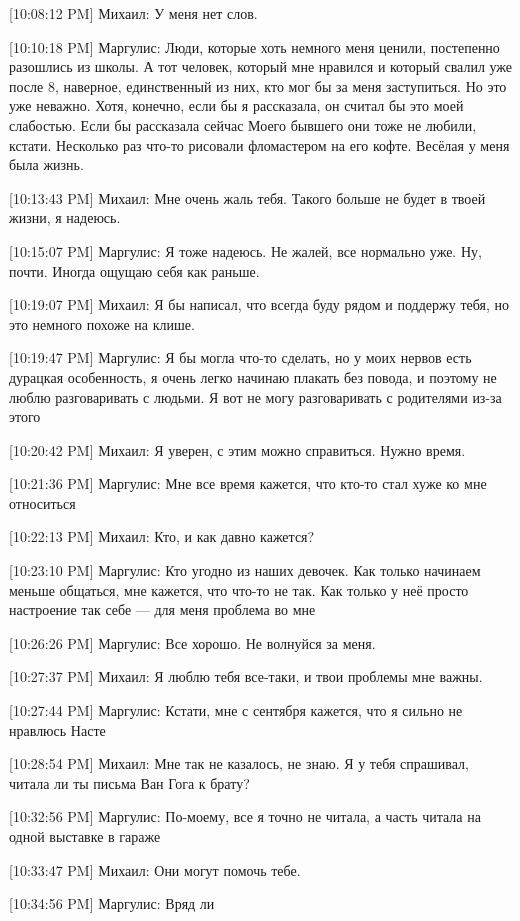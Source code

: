 \documentclass{article}
\begin{document}
[10:08:12 PM] Михаил:
У меня нет слов.

[10:10:18 PM] Маргулис:
Люди, которые хоть немного меня ценили, постепенно разошлись из школы. А тот человек, который мне нравился и который свалил уже после 8, наверное, единственный из них, кто мог бы за меня заступиться. Но это уже неважно. Хотя, конечно, если бы я рассказала, он считал бы это моей слабостью.
 Если бы рассказала сейчас
 Моего бывшего они тоже не любили, кстати. Несколько раз что-то рисовали фломастером на его кофте. Весёлая у меня была жизнь.

[10:13:43 PM] Михаил:
Мне очень жаль тебя. Такого больше не будет в твоей жизни, я надеюсь.

[10:15:07 PM] Маргулис:
Я тоже надеюсь.
 Не жалей, все нормально уже.
 Ну, почти.
 Иногда ощущаю себя как раньше.

[10:19:07 PM] Михаил:
Я бы написал, что всегда буду рядом и поддержу тебя, но это немного похоже на клише.

[10:19:47 PM] Маргулис:
Я бы могла что-то сделать, но у моих нервов есть дурацкая особенность, я очень легко начинаю плакать без повода, и поэтому не люблю разговаривать с людьми.
 Я вот не могу разговаривать с родителями из-за этого

[10:20:42 PM] Михаил:
Я уверен, с этим можно справиться.
 Нужно время.

[10:21:36 PM] Маргулис:
Мне все время кажется, что кто-то стал хуже ко мне относиться

[10:22:13 PM] Михаил:
Кто, и как давно кажется?

[10:23:10 PM] Маргулис:
Кто угодно из наших девочек. Как только начинаем меньше общаться, мне кажется, что что-то не так. Как только у неё просто настроение так себе — для меня проблема во мне

[10:26:26 PM] Маргулис:
Все хорошо. Не волнуйся за меня.

[10:27:37 PM] Михаил:
Я люблю тебя все-таки, и твои проблемы мне важны.

[10:27:44 PM] Маргулис:
Кстати, мне с сентября кажется, что я сильно не нравлюсь Насте

[10:28:54 PM] Михаил:
Мне так не казалось, не знаю.
 Я у тебя спрашивал, читала ли ты письма Ван Гога к брату?

[10:32:56 PM] Маргулис:
По-моему, все я точно не читала, а часть читала на одной выставке в гараже

[10:33:47 PM] Михаил:
Они могут помочь тебе.

[10:34:56 PM] Маргулис:
Вряд ли
\end{document}
